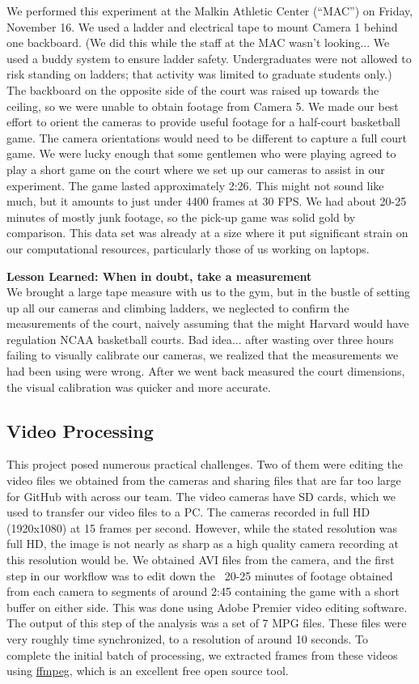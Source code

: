 \documentclass{article}
\begin{document}
We performed this experiment at the Malkin Athletic Center (``MAC'') on Friday, November 16.  
We used a ladder and electrical tape to mount Camera 1 behind one backboard.
(We did this while the staff at the MAC wasn't looking... We used a buddy system to ensure ladder safety.
Undergraduates were not allowed to risk standing on ladders; that activity was limited to graduate students only.)
The backboard on the opposite side of the court was raised up towards the ceiling,
so we were unable to obtain footage from Camera 5.
We made our best effort to orient the cameras to provide useful footage for a half-court basketball game.  
The camera orientations would need to be different to capture a full court game.
We were lucky enough that some gentlemen who were playing agreed to play
a short game on the court where we set up our cameras to assist in our experiment.
The game lasted approximately 2:26.  This might not sound like much, but it amounts to just under 4400 frames at 30 FPS.
We had about 20-25 minutes of mostly junk footage, so the pick-up game was solid gold by comparison.
This data set was already at a size where it put significant strain on our 
computational resources, particularly those of us working on laptops.

\textbf{Lesson Learned: When in doubt, take a measurement}\\
We brought a large tape measure with us to the gym, but in the bustle of setting up 
all our cameras and climbing ladders, we neglected to confirm the measurements of the court,
naively assuming that the might Harvard would have regulation NCAA basketball courts.
Bad idea... after wasting over three hours failing to visually calibrate our cameras,
we realized that the measurements we had been using were wrong.
After we went back measured the court dimensions, the visual calibration
was quicker and more accurate.

\newpage
\subsection{Video Processing}
This project posed numerous practical challenges.  
Two of them were editing the video files we obtained from the cameras 
and sharing files that are far too large for GitHub with across our team.
The video cameras have SD cards, which we used to transfer our video files to a PC.
The cameras recorded in full HD (1920x1080) at 15 frames per second.
However, while the stated resolution was full HD, the image is not nearly as sharp
as a high quality camera recording at this resolution would be.
We obtained AVI files from the camera, and the first step in our workflow was to 
edit down the ~20-25 minutes of footage obtained from each camera to segments
of around 2:45 containing the game with a short buffer on either side. 
This was done using Adobe Premier video editing software.
The output of this step of the analysis was a set of 7 MPG files.
These files were very roughly time synchronized, to a resolution of around 10 seconds.
To complete the initial batch of processing, we extracted frames from these videos
using \href{https://www.ffmpeg.org/}{ffmpeg}, which is an excellent free open source tool.
\end{document}
